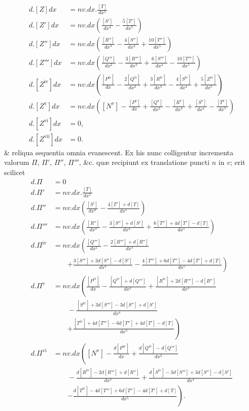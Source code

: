 \[\begin{aligned}
d.[Z]dx&=nv.dx.\frac{[T]}{dx^5}\\
d.[Z']dx&=nv.dx\left(\frac{[S']}{dx^4}-\frac{5[T']}{dx^5}\right)\\
d.[Z'']dx&=nv.dx\left(\frac{[R'']}{dx^3}-\frac{4[S'']}{dx^4}+\frac{10[T'']}{dx^5}\right)\\
d.[Z''']dx&=nv.dx\left(\frac{[Q''']}{dx^2}-\frac{3[R''']}{dx^3}+\frac{6[S''']}{dx^4}-\frac{10[T''']}{dx^5}\right)\\
d.[Z^{\mathrm{iv}}]dx&=nv.dx\left(\frac{[P^{\mathrm{iv}}]}{dx}-\frac{2[Q^{\mathrm{iv}}]}{dx^2}+\frac{3[R^{\mathrm{iv}}]}{dx^3}-\frac{4[S^{\mathrm{iv}}]}{dx^4}+\frac{5[Z^{\mathrm{iv}}]}{dx^5}\right)\\
d.[Z^{\mathrm{v}}]dx&=nv.dx\left([N^{\mathrm{v}}]-\frac{[P^{\mathrm{v}}]}{dx}+\frac{[Q^{\mathrm{v}}]}{dx^2}-\frac{[R^{\mathrm{v}}]}{dx^3}+\frac{[S^{\mathrm{v}}]}{dx^4}-\frac{[T^{\mathrm{v}}]}{dx^5}\right)\\
d.[Z^{\mathrm{vi}}]dx&=0,\\
d.[Z^{\mathrm{vii}}]dx&=0.
\end{aligned}\]
\& reliqua sequentia omnia evanescent.
Ex his nunc colligentur incrementa valorum $\Pi$, $\Pi'$, $\Pi''$, $\Pi'''$, \&c. quæ recipiunt ex translatione puncti $n$ in $v$; erit scilicet
\[\begin{aligned}
d.\Pi&=0\\
d.\Pi'&=nv.dx.\frac{[T]}{dx^5}\\
d.\Pi''&=nv.dx\left(\frac{[S']}{dx^4}-\frac{4[T']+d[T]}{dx^5}\right)\\
d.\Pi'''&=nv.dx\left(\frac{[R'']}{dx^3}-\frac{3[S'']+d[S']}{dx^4}+\frac{6[T'']+4d[T']-d[T]}{dx^5}\right)\\
d.\Pi^{\mathrm{iv}}&=nv.dx\left(\frac{[Q''']}{dx^2}-\frac{2[R''']+d[R'']}{dx^3}\right.\\&\qquad\left.+\frac{3[S''']+3d[S'']-d[S']}{dx^4}-\frac{4[T''']+6d[T'']-4d[T']+d[T]}{dx^5}\right)\\
d.\Pi^{\mathrm{v}}&=nv.dx\left(\frac{[P^{\mathrm{iv}}]}{dx}-\frac{[Q^{\mathrm{iv}}]+d[Q''']}{dx^2}+\frac{[R^{\mathrm{iv}}]+2d[R''']-d[R'']}{dx^3}\right.\\&\qquad-\frac{[S^{\mathrm{iv}}]+3d[S''']-3d[S'']+d[S']}{dx^4}\\&\qquad\left.+\frac{[T^{\mathrm{iv}}]+4d[T''']-6d[T'']+4d[T']-d[T]}{dx^5}\right)\\
d.\Pi^{\mathrm{vi}}&=nv.dx\left([N^{\mathrm{v}}]-\frac{d[P^{\mathrm{iv}}]}{dx}+\frac{d[Q^{\mathrm{iv}}]-d[Q''']}{dx^2}\right.\\&\qquad-\frac{d[R^{\mathrm{iv}}]-2d[R''']+d[R'']}{dx^3}+\frac{d[S^{\mathrm{iv}}]-3d[S''']+3d[S'']-d[S']}{dx^4}\\&\qquad\left.-\frac{d[T^{\mathrm{iv}}]-4d[T''']+6d[T'']-4d[T']+d[T]}{dx^5}\right).
\end{aligned}\]
